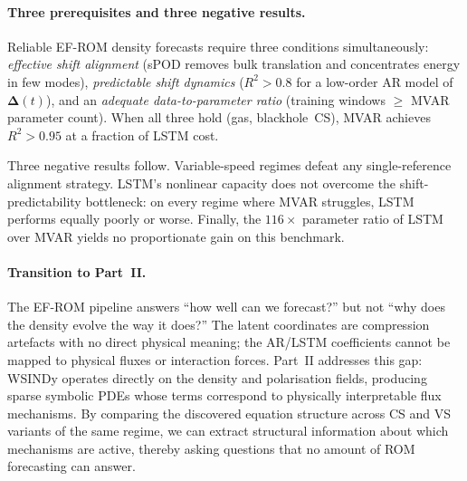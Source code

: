 \paragraph{Three prerequisites and three negative results.}

Reliable EF-ROM density forecasts require three conditions simultaneously:
\emph{effective shift alignment} (sPOD removes bulk translation and
concentrates energy in few modes), \emph{predictable shift dynamics}
($R^2>0.8$ for a low-order AR model of $\boldsymbol{\Delta}(t)$), and an
\emph{adequate data-to-parameter ratio} (training windows $\geq$ MVAR
parameter count).  When all three hold (gas, blackhole~CS), MVAR achieves
$R^2>0.95$ at a fraction of LSTM cost.

Three negative results follow.  Variable-speed regimes defeat any
single-reference alignment strategy.  LSTM's nonlinear capacity does not
overcome the shift-predictability bottleneck: on every regime where MVAR
struggles, LSTM performs equally poorly or worse.  Finally, the
$116\times$ parameter ratio of LSTM over MVAR yields no proportionate
gain on this benchmark.

\paragraph{Transition to Part~II.}
\label{sec:ch7_transition}

The EF-ROM pipeline answers ``how well can we forecast?'' but not ``why
does the density evolve the way it does?''  The latent coordinates are
compression artefacts with no direct physical meaning; the AR/LSTM
coefficients cannot be mapped to physical fluxes or interaction forces.
Part~II addresses this gap: WSINDy operates directly on the density and
polarisation fields, producing sparse symbolic PDEs whose terms correspond
to physically interpretable flux mechanisms.  By comparing the discovered
equation structure across CS and VS variants of the same regime, we can
extract structural information about which mechanisms are active,
thereby asking questions that no amount of ROM forecasting can answer.

